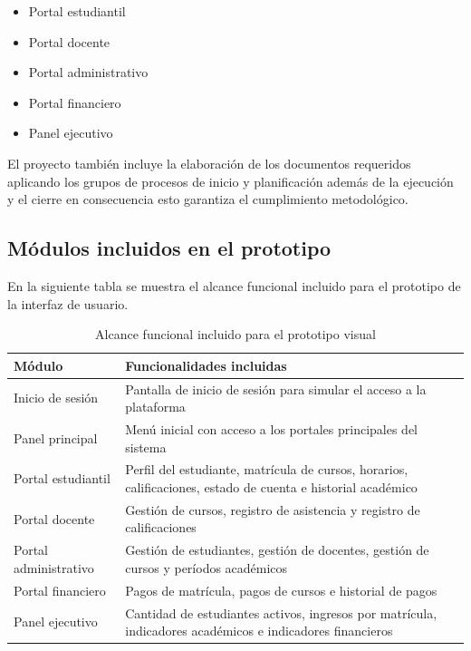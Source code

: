 \documentclass[11pt,spanish]{article}
\begin{document}
\begin{itemize}[leftmargin=*]
    \item Portal estudiantil
    \item Portal docente
    \item Portal administrativo
    \item Portal financiero
    \item Panel ejecutivo
\end{itemize}

El proyecto también incluye la elaboración de los documentos requeridos aplicando los grupos de procesos de inicio y planificación además de la ejecución y el cierre en consecuencia esto garantiza el cumplimiento metodológico.

\subsection{Módulos incluidos en el prototipo}

En la siguiente tabla se muestra el alcance funcional incluido para el prototipo de la interfaz de usuario.

\begin{table}[H]
\centering
\caption{Alcance funcional incluido para el prototipo visual}
\label{tab:modulos-incluidos}
{\small
\begin{tabularx}{\textwidth}{L{4cm} Y}
\toprule
\textbf{Módulo} & \textbf{Funcionalidades incluidas} \\
\midrule
Inicio de sesión & Pantalla de inicio de sesión para simular el acceso a la plataforma \\
Panel principal & Menú inicial con acceso a los portales principales del sistema \\
Portal estudiantil & Perfil del estudiante, matrícula de cursos, horarios, calificaciones, estado de cuenta e historial académico \\
Portal docente & Gestión de cursos, registro de asistencia y registro de calificaciones \\
Portal administrativo & Gestión de estudiantes, gestión de docentes, gestión de cursos y períodos académicos \\
Portal financiero & Pagos de matrícula, pagos de cursos e historial de pagos \\
Panel ejecutivo & Cantidad de estudiantes activos, ingresos por matrícula, indicadores académicos e indicadores financieros \\
\bottomrule
\end{tabularx}
}
\end{table}
\end{document}
